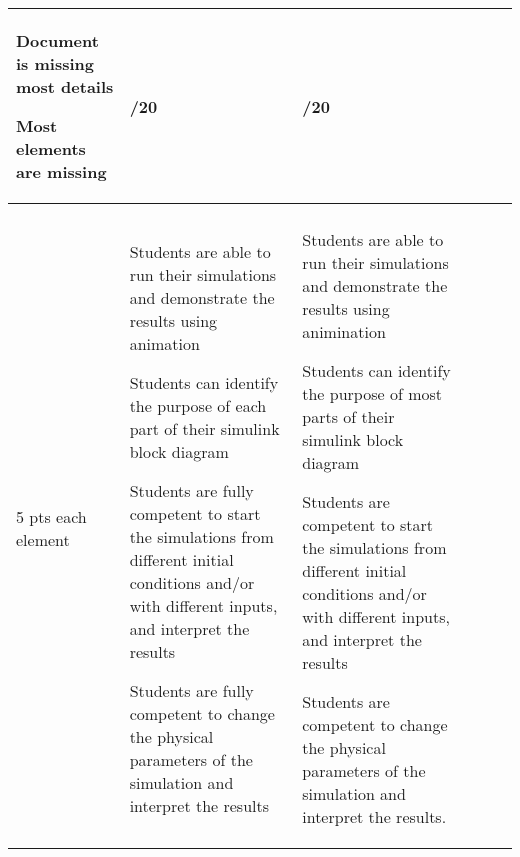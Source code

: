 \documentclass[11pt,landscape]{amsart}
\begin{document}
\begin{tabular}{llllcc}
\begin{minipage}{2.5in}\begin{list}{}{\leftmargin=1em}
\item Document is missing most details
\item Most elements are missing
\end{list}
\end{minipage}
&  \underline{\hspace{.25in}}/20 &\underline{\hspace{.25in}}/20 \\[2pt]\midrule

\begin{sideways}\hspace{-.35in}\begin{minipage}{.75in}\begin{center}\textbf{Demonstration} \\ 5 pts each element\end{center}\end{minipage}\end{sideways}  &


\begin{minipage}{2.5in}\begin{list}{}{\leftmargin=1em}
\item Students are able to run their simulations and demonstrate the results using animation
\item Students can identify the purpose of each part of their simulink block diagram
\item Students are fully competent to start the simulations from different initial conditions and/or with different inputs, and interpret the results
\item Students are fully competent to change the physical parameters of the simulation and interpret the results
\end{list}
\end{minipage}
\vspace{.1in}
 &

\begin{minipage}{2.5in}\begin{list}{}{\leftmargin=1em}
\item Students are able to run their simulations and demonstrate the results using animination
\item Students can identify the purpose of most parts of their simulink block diagram
\item Students are competent to start the simulations from different initial conditions and/or with different inputs, and interpret the results
\item Students are competent to change the physical parameters of the simulation and interpret the results.
\end{list}
\end{minipage}
 &


\end{tabular}
\end{document}
